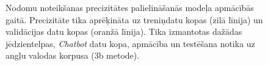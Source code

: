 \begin{figure}[h] 
   \centering
   \caption{Nodomu noteikšanas precizitātes palielināšanās modeļa apmācībās gaitā. Precizitāte tika aprēķināta uz treniņdatu kopas (zilā līnija) un validācijas datu kopas (oranžā līnija). Tika izmantotas dažādas jēdzientelpas, \textit{Chatbot} datu kopa, apmācība un testēšana notika uz angļu valodas korpusa (3b metode).} 
   \label{fig:chabot-bert-xlm-en}
\end{figure}


